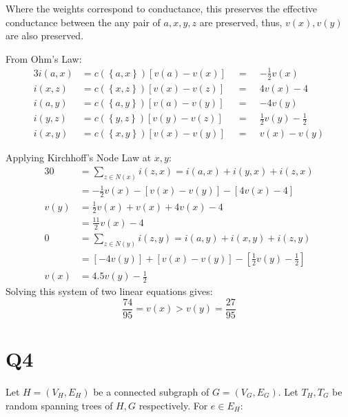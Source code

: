 \documentclass[a4paper, 11pt]{article}
\def\set#1{\left\{ #1 \right\}}
\begin{document}
Where the weights correspond to conductance, this preserves the effective conductance between the any pair of $a,x,y,z$ are preserved, thus, $v(x),v(y)$ are also preserved. 

From Ohm's Law: 
\begin{alignat*}{3}
	i(a,x) &= c(\set{a,x})\left[v(a)-v(x)\right] &\;\;=\;\;& -\frac 12v(x)        \\
	i(x,z) &= c(\set{x,z})\left[v(x)-v(z)\right] &\;\;=\;\;& 4v(x)-4              \\
	i(a,y) &= c(\set{a,y})\left[v(a)-v(y)\right] &\;\;=\;\;& -4v(y)               \\
	i(y,z) &= c(\set{y,z})\left[v(y)-v(z)\right] &\;\;=\;\;& \frac 12v(y)-\frac12 \\
	i(x,y) &= c(\set{x,y})\left[v(x)-v(y)\right] &\;\;=\;\;& v(x)-v(y)            
\end{alignat*}

Applying Kirchhoff's Node Law at $x,y$: 
\begin{alignat*}{3}
	     0 &= \sum_{z\in N(x)}i(z,x) = i(a,x)+i(y,x)+i(z,x) \\
	       &= -\frac 12v(x) - [v(x)-v(y)]- [4v(x)-4]        \\
	  v(y) &= \frac 12v(x) + v(x) + 4v(x)-4                 \\
	       &= \frac {11}2v(x)-4                             \\
	     0 &= \sum_{z\in N(y)}i(z,y) = i(a,y)+i(x,y)+i(z,y) \\
		   &=  \left[ -4v(y) \right]
		      +\left[ v(x)-v(y) \right]
		      -\left[ \frac 12 v(y) - \frac 12 \right]      \\
	  v(x) &= 4.5v(y) - \frac 12 
\end{alignat*}
Solving this system of two linear equations gives: 
\[
	\frac{74}{95}=v(x) > v(y)=\frac{27}{95}
\]


\pagebreak
\section*{Q4}
Let $H=(V_H,E_H)$ be a connected subgraph of $G=(V_G,E_G)$. Let $T_H,T_G$ be random spanning trees of $H,G$ respectively. For $e\in E_H$:
\end{document}
